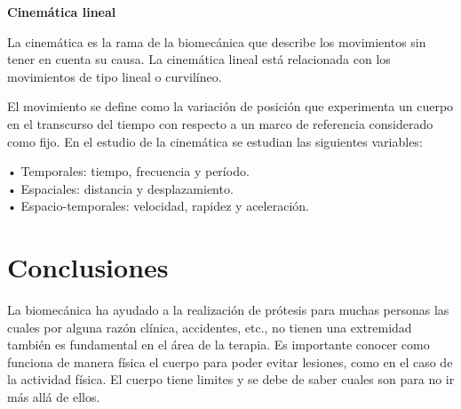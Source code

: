 \documentclass{article}
\begin{document}
\textbf{Cinemática lineal}

 La cinemática es la rama de la biomecánica que describe los movimientos sin tener en cuenta su causa. La cinemática lineal está relacionada con los movimientos de tipo lineal o curvilíneo.\\
 \vspace{5mm}
 
El movimiento se define como la variación de posición que experimenta un cuerpo en el transcurso del tiempo con respecto a un marco de referencia considerado como fijo. En el estudio de la cinemática se estudian las siguientes variables: 
\item

• Temporales: tiempo, frecuencia y período. \\
• Espaciales: distancia y desplazamiento. \\
• Espacio-temporales: velocidad, rapidez y aceleración. \\


\section{Conclusiones}
La biomecánica ha ayudado a la realización de prótesis para muchas personas las cuales por alguna razón clínica, accidentes, etc., no tienen una extremidad también es fundamental en el área de la terapia. Es importante conocer como funciona de manera física el cuerpo para poder evitar lesiones, como en el caso de la actividad física. El cuerpo tiene limites y se debe de saber cuales son para no ir más allá de ellos.




\end{document}
